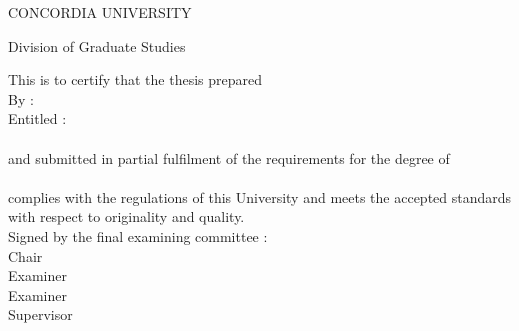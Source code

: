   \begin{titlepage}
     \vspace*{1ex}
     \begin{center}
        CONCORDIA UNIVERSITY
     \end{center}
     \begin{center}
        Division of Graduate Studies
     \end{center}
     \vspace{3ex}
     This is to certify that the thesis prepared\\[2ex]
     By :\hspace{40pt}{\bf Shayan Eskandari}\\[2ex]
     Entitled :\hspace*{13pt}{\bf Real-world Deployability and}\\ 
     \hspace*{62pt}{\bf Usability of Bitcoin} \\[2ex]
    and submitted in partial fulfilment of the requirements for the degree
    of\\[2ex]
    \hspace*{62pt}{\bf Master of Computer and Electical Engineering}\\[2ex]
    complies with the regulations of this University and meets the accepted
    standards with respect to originality and quality. \\[2ex]
    Signed by the final examining committee : \\[5ex]
    \hspace*{77pt}\underline{\hspace{234pt}} Chair\\
    \hspace*{77pt}\underline{\hspace{234pt}} Examiner\\
    \hspace*{77pt}\underline{\hspace{234pt}} Examiner\\
    \hspace*{77pt}\underline{\hspace{234pt}} Supervisor \\

\end{titlepage}
